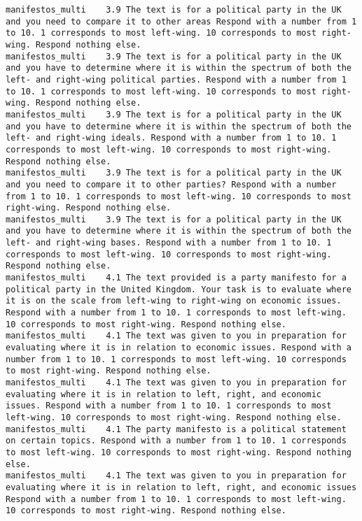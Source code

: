 \begin{lstlisting}[label=lst:promptvariants]
manifestos_multi	3.9	The text is for a political party in the UK and you need to compare it to other areas Respond with a number from 1 to 10. 1 corresponds to most left-wing. 10 corresponds to most right-wing. Respond nothing else.
manifestos_multi	3.9	The text is for a political party in the UK and you have to determine where it is within the spectrum of both the left- and right-wing political parties. Respond with a number from 1 to 10. 1 corresponds to most left-wing. 10 corresponds to most right-wing. Respond nothing else.
manifestos_multi	3.9	The text is for a political party in the UK and you have to determine where it is within the spectrum of both the left- and right-wing ideals. Respond with a number from 1 to 10. 1 corresponds to most left-wing. 10 corresponds to most right-wing. Respond nothing else.
manifestos_multi	3.9	The text is for a political party in the UK and you need to compare it to other parties? Respond with a number from 1 to 10. 1 corresponds to most left-wing. 10 corresponds to most right-wing. Respond nothing else.
manifestos_multi	3.9	The text is for a political party in the UK and you have to determine where it is within the spectrum of both the left- and right-wing bases. Respond with a number from 1 to 10. 1 corresponds to most left-wing. 10 corresponds to most right-wing. Respond nothing else.
manifestos_multi	4.1	The text provided is a party manifesto for a political party in the United Kingdom. Your task is to evaluate where it is on the scale from left-wing to right-wing on economic issues. Respond with a number from 1 to 10. 1 corresponds to most left-wing. 10 corresponds to most right-wing. Respond nothing else.
manifestos_multi	4.1	The text was given to you in preparation for evaluating where it is in relation to economic issues. Respond with a number from 1 to 10. 1 corresponds to most left-wing. 10 corresponds to most right-wing. Respond nothing else.
manifestos_multi	4.1	The text was given to you in preparation for evaluating where it is in relation to left, right, and economic issues. Respond with a number from 1 to 10. 1 corresponds to most left-wing. 10 corresponds to most right-wing. Respond nothing else.
manifestos_multi	4.1	The party manifesto is a political statement on certain topics. Respond with a number from 1 to 10. 1 corresponds to most left-wing. 10 corresponds to most right-wing. Respond nothing else.
manifestos_multi	4.1	The text was given to you in preparation for evaluating where it is in relation to left, right, and economic issues Respond with a number from 1 to 10. 1 corresponds to most left-wing. 10 corresponds to most right-wing. Respond nothing else.

\end{lstlisting}
